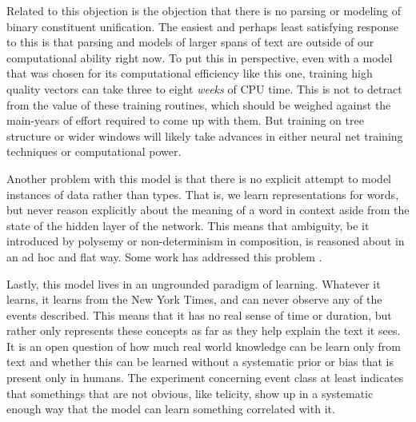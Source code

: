 \documentclass[11pt,letterpaper]{article}
\begin{document}
Related to this objection is the objection that there is no parsing or modeling of
binary constituent unification.
The easiest and perhaps least satisfying response to this is that parsing and models
of larger spans of text are outside of our computational ability right now. To put this
in perspective, even with a model that was chosen for its computational efficiency like
this one, training high quality vectors can take three \cite{rami} to
eight \cite{DBLP:journals/corr/abs-1301-3781} {\em weeks} of CPU time.
This is not to detract from the value of these training routines, which should be weighed
against the main-years of effort required to come up with them.
But training on tree structure or wider windows will likely take advances in either
neural net training techniques or computational power.



Another problem with this model is that there is no explicit attempt to model
instances of data rather than types. That is, we learn representations for
words, but never reason explicitly about the meaning of a word in context aside
from the state of the hidden layer of the network. 
This means that ambiguity, be it introduced by polysemy or non-determinism in
composition, is reasoned about in an ad hoc and flat way.
Some work has addressed this problem \cite{multiplePrototypes1,multiplePrototypes2}.





Lastly, this model lives in an ungrounded paradigm of learning. Whatever it learns,
it learns from the New York Times, and can never observe any of the events described.
This means that it has no real sense of time or duration, but rather only represents
these concepts as far as they help explain the text it sees.
It is an open question of how much real world knowledge can be learn only from text
and whether this can be learned without a systematic prior or bias that is present only in humans.
The experiment concerning event class at least indicates that somethings that are
not obvious, like telicity, show up in a systematic enough way that the model can learn
something correlated with it.







%
%
%
\end{document}
